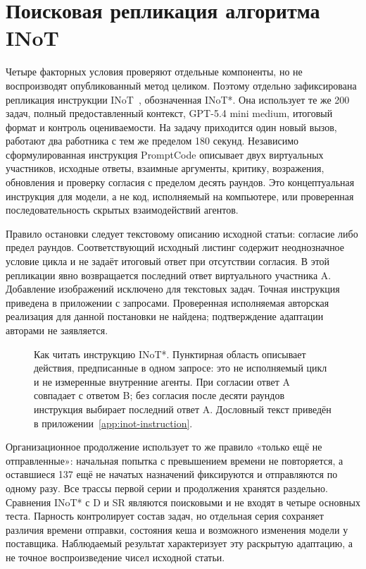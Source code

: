 \section{Поисковая репликация алгоритма INoT}
\label{sec:inot-replication}
Четыре факторных условия проверяют отдельные компоненты, но не воспроизводят опубликованный метод целиком. Поэтому отдельно зафиксирована репликация инструкции INoT~\cite{sun2025inot}, обозначенная INoT*. Она использует те же 200 задач, полный предоставленный контекст, GPT-5.4 mini medium, итоговый формат и контроль оцениваемости. На задачу приходится один новый вызов, работают два работника с тем же пределом 180 секунд. Независимо сформулированная инструкция PromptCode описывает двух виртуальных участников, исходные ответы, взаимные аргументы, критику, возражения, обновления и проверку согласия с пределом десять раундов. Это концептуальная инструкция для модели, а не код, исполняемый на компьютере, или проверенная последовательность скрытых взаимодействий агентов.

Правило остановки следует текстовому описанию исходной статьи: согласие либо предел раундов. Соответствующий исходный листинг содержит неоднозначное условие цикла и не задаёт итоговый ответ при отсутствии согласия. В этой репликации явно возвращается последний ответ виртуального участника A. Добавление изображений исключено для текстовых задач. Точная инструкция приведена в приложении с запросами. Проверенная исполняемая авторская реализация для данной постановки не найдена; подтверждение адаптации авторами не заявляется.

\begin{figure}[htbp]\centering

\caption{Как читать инструкцию INoT*. Пунктирная область описывает действия, предписанные в одном запросе: это не исполняемый цикл и не измеренные внутренние агенты. При согласии ответ A совпадает с ответом B; без согласия после десяти раундов инструкция выбирает последний ответ A. Дословный текст приведён в приложении~\ref{app:inot-instruction}.}
\label{fig:inot-instruction}
\end{figure}
\FloatBarrier

Организационное продолжение использует то же правило «только ещё не отправленные»: начальная попытка с превышением времени не повторяется, а оставшиеся 137 ещё не начатых назначений фиксируются и отправляются по одному разу. Все трассы первой серии и продолжения хранятся раздельно. Сравнения INoT* с D и SR являются поисковыми и не входят в четыре основных теста. Парность контролирует состав задач, но отдельная серия сохраняет различия времени отправки, состояния кеша и возможного изменения модели у поставщика. Наблюдаемый результат характеризует эту раскрытую адаптацию, а не точное воспроизведение чисел исходной статьи.
